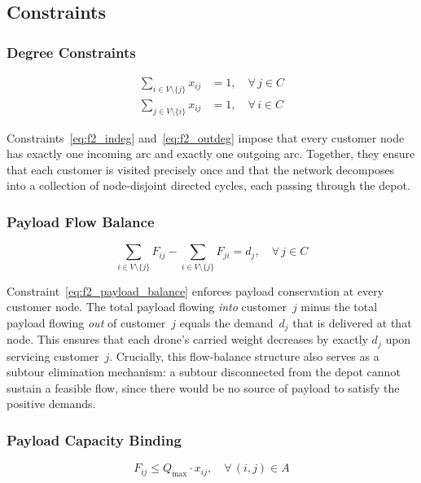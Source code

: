 \documentclass[11pt,a4paper]{article}
\begin{document}
\subsection{Constraints}

\subsubsection{Degree Constraints}
\begin{align}
  \sum_{i \in V \setminus \{j\}} x_{ij} &= 1, \quad \forall\, j \in C \label{eq:f2_indeg}\\[4pt]
  \sum_{j \in V \setminus \{i\}} x_{ij} &= 1, \quad \forall\, i \in C \label{eq:f2_outdeg}
\end{align}

Constraints~\eqref{eq:f2_indeg} and~\eqref{eq:f2_outdeg} impose that every customer node has exactly one incoming arc and exactly one outgoing arc. Together, they ensure that each customer is visited precisely once and that the network decomposes into a collection of node-disjoint directed cycles, each passing through the depot.

\subsubsection{Payload Flow Balance}
\begin{equation}
  \sum_{i \in V \setminus \{j\}} F_{ij} - \sum_{i \in V \setminus \{j\}} F_{ji} = d_j, \quad \forall\, j \in C
  \label{eq:f2_payload_balance}
\end{equation}

Constraint~\eqref{eq:f2_payload_balance} enforces payload conservation at every customer node. The total payload flowing \emph{into} customer~$j$ minus the total payload flowing \emph{out} of customer~$j$ equals the demand~$d_j$ that is delivered at that node. This ensures that each drone's carried weight decreases by exactly $d_j$ upon servicing customer~$j$. Crucially, this flow-balance structure also serves as a subtour elimination mechanism: a subtour disconnected from the depot cannot sustain a feasible flow, since there would be no source of payload to satisfy the positive demands.

\subsubsection{Payload Capacity Binding}
\begin{equation}
  F_{ij} \le Q_{\max} \cdot x_{ij}, \quad \forall\, (i,j) \in A
  \label{eq:f2_payload_cap}
\end{equation}
\end{document}
